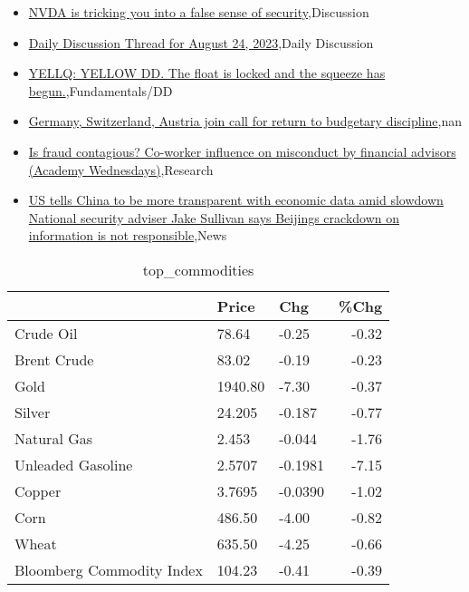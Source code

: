 \documentclass{article}%
\begin{document}
%
\begin{itemize}%
\item%
\href{https://reddit.com/r/wallstreetbets/comments/15zzhie/nvda\_is\_tricking\_you\_into\_a\_false\_sense\_of/}{NVDA is tricking you into a false sense of security},Discussion%
\item%
\href{https://reddit.com/r/wallstreetbets/comments/15zxjz0/daily\_discussion\_thread\_for\_august\_24\_2023/}{Daily Discussion Thread for August 24, 2023},Daily Discussion%
\item%
\href{https://reddit.com/r/StockMarket/comments/15zsky1/yellq\_yellow\_dd\_the\_float\_is\_locked\_and\_the/}{YELLQ: YELLOW DD. The float is locked and the squeeze has begun.},Fundamentals/DD%
\item%
\href{https://reddit.com/r/Economics/comments/15z99a1/germany\_switzerland\_austria\_join\_call\_for\_return/}{Germany, Switzerland, Austria join call for return to budgetary discipline},nan%
\item%
\href{https://reddit.com/r/Economics/comments/15z7crd/is\_fraud\_contagious\_coworker\_influence\_on/}{Is fraud contagious? Co-worker influence on misconduct by financial advisors (Academy Wednesdays)},Research%
\item%
\href{https://reddit.com/r/Economics/comments/15yujqe/us\_tells\_china\_to\_be\_more\_transparent\_with/}{US tells China to be more transparent with economic data amid slowdown  National security adviser Jake Sullivan says Beijings crackdown on information is not responsible},News%
\end{itemize}%


\begin{table}[htbp]%
\caption{top\_commodities}%
\centering%
\begin{adjustbox}{width=1\textwidth}%
\begin{tabular}{lllr}
\toprule
                          &   Price &     Chg &  \%Chg \\
\midrule
               Crude Oil  &   78.64 &   -0.25 & -0.32 \\
             Brent Crude  &   83.02 &   -0.19 & -0.23 \\
                    Gold  & 1940.80 &   -7.30 & -0.37 \\
                  Silver  &  24.205 &  -0.187 & -0.77 \\
             Natural Gas  &   2.453 &  -0.044 & -1.76 \\
       Unleaded Gasoline  &  2.5707 & -0.1981 & -7.15 \\
                  Copper  &  3.7695 & -0.0390 & -1.02 \\
                    Corn  &  486.50 &   -4.00 & -0.82 \\
                   Wheat  &  635.50 &   -4.25 & -0.66 \\
Bloomberg Commodity Index &  104.23 &   -0.41 & -0.39 \\
\bottomrule
\end{tabular}
%
\end{adjustbox}%
\end{table}
\end{document}
